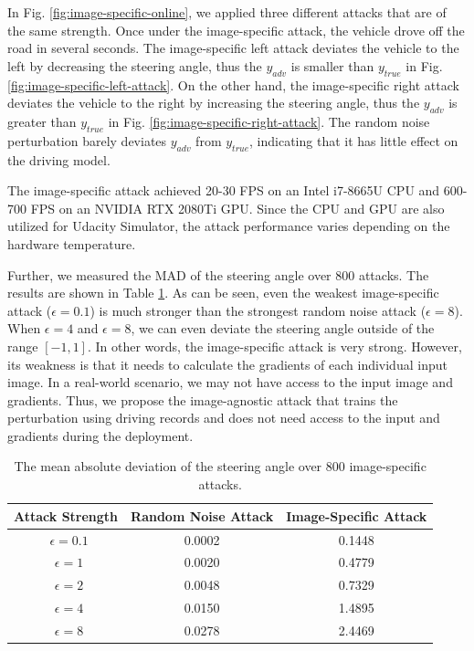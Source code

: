 In Fig. \ref{fig:image-specific-online}, we applied three different attacks that are of the same strength. Once under the image-specific attack, the vehicle drove off the road in several seconds. The image-specific left attack deviates the vehicle to the left by decreasing the steering angle, thus the $y_{adv}$ is smaller than $y_{true}$ in Fig. \ref{fig:image-specific-left-attack}. On the other hand, the image-specific right attack deviates the vehicle to the right by increasing the steering angle, thus the $y_{adv}$ is greater than $y_{true}$ in Fig. \ref{fig:image-specific-right-attack}. The random noise perturbation barely deviates $y_{adv}$ from $y_{true}$, indicating that it has little effect on the driving model.

The image-specific attack achieved 20-30 FPS on an Intel i7-8665U CPU and 600-700 FPS on an NVIDIA RTX 2080Ti GPU. Since the CPU and GPU are also utilized for Udacity Simulator, the attack performance varies depending on the hardware temperature.

Further, we measured the MAD of the steering angle over 800 attacks. The results are shown in Table \ref{tab:image-specific}. As can be seen, even the weakest image-specific attack ($\epsilon=0.1$) is much stronger than the strongest random noise attack ($\epsilon=8$). When $\epsilon = 4$ and $\epsilon = 8$, we can even deviate the steering angle outside of the range $[-1, 1]$. In other words, the image-specific attack is very strong. However, its weakness is that it needs to calculate the gradients of each individual input image. In a real-world scenario, we may not have access to the input image and gradients. Thus, we propose the image-agnostic attack that trains the perturbation using driving records and does not need access to the input and gradients during the deployment.

\begin{table}[H]
    \centering
    \begin{tabular}{ccc}
    \hline
    Attack Strength & Random Noise Attack & Image-Specific Attack\\
    \hline
    \ $\epsilon=0.1$    & 0.0002    & 0.1448 \\
    \ $\epsilon=1$      & 0.0020    & 0.4779 \\
    \ $\epsilon=2$      & 0.0048    & 0.7329 \\
    \ $\epsilon=4$      & 0.0150    & 1.4895 \\
    \ $\epsilon=8$      & 0.0278    & 2.4469 \\
    \hline
    \end{tabular}
    \caption{The mean absolute deviation of the steering angle over 800 image-specific attacks.}
    \label{tab:image-specific}
\end{table}

